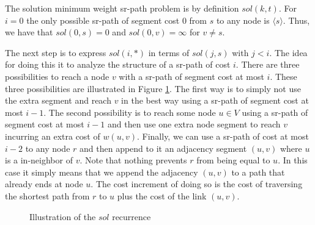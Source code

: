 The solution minimum weight sr-path problem is by definition $\mathit{sol}(k, t)$. For $i = 0$ the only possible sr-path of segment cost $0$ from $s$ to any node
is $\langle s \rangle$. Thus, we have that $\mathit{sol}(0, s) = 0$ and $\mathit{sol}(0, v) = \infty$ for $v \neq s$. 

The next step is to express $\mathit{sol}(i, *)$ in terms of $\mathit{sol}(j, s)$ with $j < i$.
The idea for doing this it to analyze the structure of a sr-path of cost $i$. There are three possibilities 
to reach a node $v$ with a sr-path of segment cost at most $i$.
These three possibilities are illustrated in Figure \ref{fig:dp}.
The first way is to simply not use
the extra segment and reach $v$ in the best way using a sr-path of segment cost at most
$i - 1$. The second possibility is to reach some node $u \in V$ using a sr-path of
segment cost at most $i - 1$ and then use one extra node segment to reach $v$ incurring an extra cost of $w(u, v)$. 
Finally, we can use a sr-path of cost at most $i - 2$ to any node $r$ and then append to it an adjacency
segment $(u, v)$ where $u$ is a in-neighbor of $v$. Note that nothing prevents $r$ from being equal to
$u$. In this case it simply means that we append the adjacency $(u, v)$ to a path that already ends at node
$u$. The cost increment of doing so is the cost of traversing the shortest path from $r$ to $u$ plus the cost
of the link $(u, v)$.

 \begin{figure}
 \begin{center}
 \end{center}
 \caption{Illustration of the $\mathit{sol}$ recurrence}
 \label{fig:dp}
 \end{figure}

